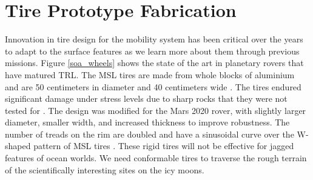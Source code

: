 \documentclass{article}
\begin{document}
\section{Tire Prototype Fabrication}
\label{sec:tire-prototyoe-fabrication}
Innovation in tire design for the mobility system has been critical over the years to adapt to the surface features as we learn more about them through previous missions. Figure \ref{soa_wheels} shows the state of the art in planetary rovers that have matured TRL. The MSL tires are made from whole blocks of aluminium and are 50 centimeters in diameter and 40 centimeters wide \cite{haggart2008mobility}. The tires endured significant damage under stress levels due to sharp rocks that they were not tested for \cite{toupet2018traction}. The design was modified for the Mars 2020 rover, with slightly larger diameter, smaller width, and increased thickness to improve robustness. The number of treads on the rim are doubled and have a sinusoidal curve over the W-shaped pattern of MSL tires \cite{inotsume2019parametric}. These rigid tires will not be effective for jagged features of ocean worlds. We need conformable tires to traverse the rough terrain of the scientifically interesting sites on the icy moons.
\end{document}
